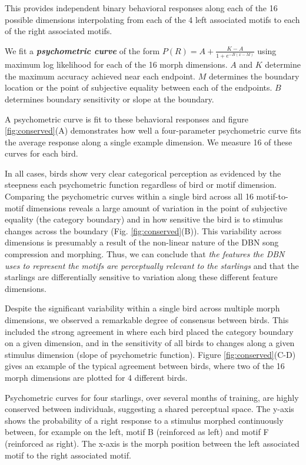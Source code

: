 

This provides independent binary behavioral responses along each of the 16 possible dimensions interpolating from each of the 4 left associated motifs to each of the right associated motifs.

We fit a \textit{\textbf{psychometric curve}} of the form $P(R) = A + \frac{K - A}{1 + e^{-B(x-M)}}$ using maximum log likelihood for each of the 16 morph dimensions. $A$ and $K$ determine the maximum accuracy achieved near each endpoint. $M$ determines the boundary location or the point of subjective equality between each of the endpoints. $B$ determines boundary sensitivity or slope at the boundary.

A psychometric curve is fit to these behavioral responses and figure \ref{fig:conserved}(A) demonstrates how well a four-parameter psychometric curve fits the average response along a single example dimension. We measure 16 of these curves for each bird.

In all cases, birds show very clear categorical perception as evidenced by the steepness each psychometric function regardless of bird or motif dimension. Comparing the psychometric curves within a single bird across all 16 motif-to-motif dimensions reveals a large amount of variation in the point of subjective equality (the category boundary) and in how sensitive the bird is to stimulus changes across the boundary (Fig. \ref{fig:conserved}(B)). This variability across dimensions is presumably a result of the non-linear nature of the \ac{DBN} song compression and morphing. Thus, we can conclude that \emph{the features the DBN uses to represent the motifs are perceptually relevant to the starlings} and that the starlings are differentially sensitive to variation along these different feature dimensions.

Despite the significant variability within a single bird across multiple morph dimensions, we observed a remarkable degree of consensus between birds.  This included the strong agreement in where each bird placed the category boundary on a given dimension, and in the sensitivity of all birds to changes along a given stimulus dimension (slope of psychometric function). Figure \ref{fig:conserved}(C-D) gives an example of the typical agreement between birds, where two of the 16 morph dimensions are plotted for 4 different birds.

Psychometric curves for four starlings, over several months of training, are highly conserved between individuals, suggesting a shared perceptual space. The y-axis shows the probability of a right response to a stimulus morphed continuously between, for example on the left, motif B (reinforced as left) and motif F (reinforced as right). The x-axis is the morph position between the left associated motif to the right associated motif.

